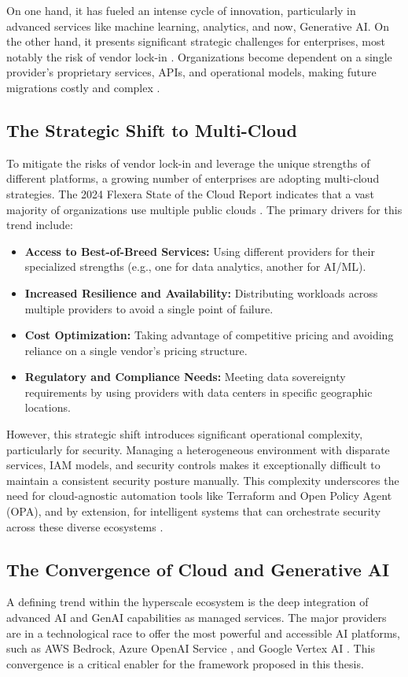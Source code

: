 On one hand, it has fueled an intense cycle of innovation, particularly in advanced services like machine learning, analytics, and now, Generative AI. On the other hand, it presents significant strategic challenges for enterprises, most notably the risk of vendor lock-in \cite{patel_comparative_nodate}. Organizations become dependent on a single provider’s proprietary services, APIs, and operational models, making future migrations costly and complex \cite{n_koritala_cloud-first_2025}.

\subsection{The Strategic Shift to Multi-Cloud}
To mitigate the risks of vendor lock-in and leverage the unique strengths of different platforms, a growing number of enterprises are adopting multi-cloud strategies. The 2024 Flexera State of the Cloud Report indicates that a vast majority of organizations use multiple public clouds \cite{flexera_flexera_2024}. The primary drivers for this trend include:
\begin{itemize}
    \item \textbf{Access to Best-of-Breed Services:} Using different providers for their specialized strengths (e.g., one for data analytics, another for AI/ML).
    \item \textbf{Increased Resilience and Availability:} Distributing workloads across multiple providers to avoid a single point of failure.
    \item \textbf{Cost Optimization:} Taking advantage of competitive pricing and avoiding reliance on a single vendor's pricing structure.
    \item \textbf{Regulatory and Compliance Needs:} Meeting data sovereignty requirements by using providers with data centers in specific geographic locations.
\end{itemize}
However, this strategic shift introduces significant operational complexity, particularly for security. Managing a heterogeneous environment with disparate services, IAM models, and security controls makes it exceptionally difficult to maintain a consistent security posture manually. This complexity underscores the need for cloud-agnostic automation tools like Terraform and Open Policy Agent (OPA), and by extension, for intelligent systems that can orchestrate security across these diverse ecosystems \cite{dasari_infrastructure_2025}.

\subsection{The Convergence of Cloud and Generative AI}
A defining trend within the hyperscale ecosystem is the deep integration of advanced AI and GenAI capabilities as managed services. The major providers are in a technological race to offer the most powerful and accessible AI platforms, such as AWS Bedrock\cite{noauthor_claude_nodate}, Azure OpenAI Service \cite{microsoft_what_2024}, and Google Vertex AI \cite{noauthor_ground_nodate}. This convergence is a critical enabler for the framework proposed in this thesis.

